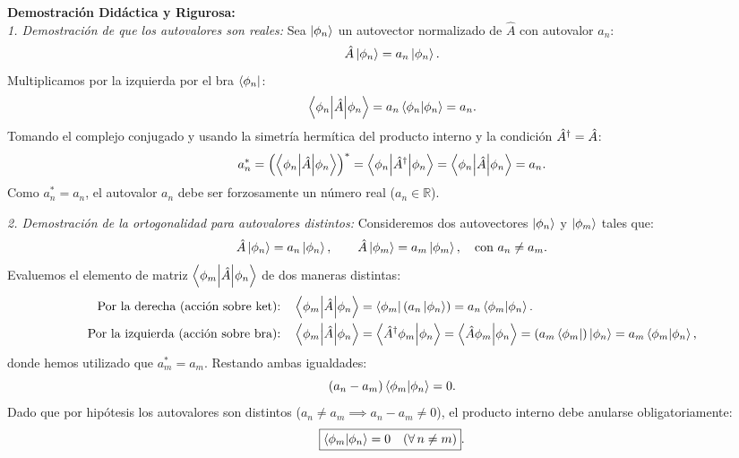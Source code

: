 \textbf{Demostración Didáctica y Rigurosa:}\\
\textit{1. Demostración de que los autovalores son reales:}
Sea $\left| \phi_n \right\rangle$ un autovector normalizado de $\hat{A}$ con autovalor $a_n$:
\begin{equation}
    \hat{A}\left| \phi_n \right\rangle = a_n\left| \phi_n \right\rangle.
\end{equation}
Multiplicamos por la izquierda por el bra $\left\langle \phi_n \right|$:
\begin{equation}
    \left\langle \phi_n \middle| \hat{A} \middle| \phi_n \right\rangle = a_n\left\langle \phi_n \middle| \phi_n \right\rangle = a_n.
\end{equation}
Tomando el complejo conjugado y usando la simetría hermítica del producto interno y la condición $\hat{A}^\dagger = \hat{A}$:
\begin{equation}
    a_n^* = \left(\left\langle \phi_n \middle| \hat{A} \middle| \phi_n \right\rangle\right)^* = \left\langle \phi_n \middle| \hat{A}^\dagger \middle| \phi_n \right\rangle = \left\langle \phi_n \middle| \hat{A} \middle| \phi_n \right\rangle = a_n.
\end{equation}
Como $a_n^* = a_n$, el autovalor $a_n$ debe ser forzosamente un número real ($a_n \in \mathbb{R}$).

\textit{2. Demostración de la ortogonalidad para autovalores distintos:}
Consideremos dos autovectores $\left| \phi_n \right\rangle$ y $\left| \phi_m \right\rangle$ tales que:
\begin{equation}
    \hat{A}\left| \phi_n \right\rangle = a_n\left| \phi_n \right\rangle, \qquad \hat{A}\left| \phi_m \right\rangle = a_m\left| \phi_m \right\rangle, \quad \text{con } a_n \neq a_m.
\end{equation}
Evaluemos el elemento de matriz $\left\langle \phi_m \middle| \hat{A} \middle| \phi_n \right\rangle$ de dos maneras distintas:
\begin{align}
    \text{Por la derecha (acción sobre ket):} \quad &\left\langle \phi_m \middle| \hat{A} \middle| \phi_n \right\rangle = \left\langle \phi_m \right|(a_n\left| \phi_n \right\rangle) = a_n\left\langle \phi_m \middle| \phi_n \right\rangle. \\
    \text{Por la izquierda (acción sobre bra):} \quad &\left\langle \phi_m \middle| \hat{A} \middle| \phi_n \right\rangle = \left\langle \hat{A}^\dagger\phi_m \middle| \phi_n \right\rangle = \left\langle \hat{A}\phi_m \middle| \phi_n \right\rangle = (a_m\left\langle \phi_m \right|)\left| \phi_n \right\rangle = a_m\left\langle \phi_m \middle| \phi_n \right\rangle,
\end{align}
donde hemos utilizado que $a_m^* = a_m$. Restando ambas igualdades:
\begin{equation}
    (a_n - a_m)\left\langle \phi_m \middle| \phi_n \right\rangle = 0.
\end{equation}
Dado que por hipótesis los autovalores son distintos ($a_n \neq a_m \implies a_n - a_m \neq 0$), el producto interno debe anularse obligatoriamente:
\begin{equation}
    \boxed{\left\langle \phi_m \middle| \phi_n \right\rangle = 0 \quad (\forall\,n \neq m)}.
\end{equation}

